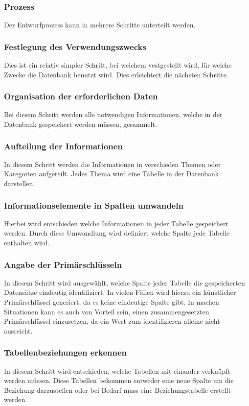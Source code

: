 \subsubsection{Prozess}
Der Entwurfprozess kann in mehrere Schritte unterteilt werden.
\subsubsection{Festlegung des Verwendungszwecks}
Dies ist ein relativ simpler Schritt, bei welchem vestgestellt wird, für welche Zwecke die Datenbank benutzt wird. Dies erleichtert die nächsten Schritte.
\subsubsection{Organisation der erforderlichen Daten}
Bei diesem Schritt werden alle notwendigen Informationen, welche in der Datenbank gespeichert werden müssen, gesammelt.
\subsubsection{Aufteilung der Informationen}
In diesem Schritt werden die Informationen in verschieden Themen oder Kategorien aufgeteilt. Jedes Thema wird eine Tabelle in der Datenbank darstellen.
\subsubsection{Informationselemente in Spalten umwandeln}
Hierbei wird entschieden welche Informationen in jeder Tabelle gespeichert werden. Durch diese Umwandlung wird definiert welche Spalte jede Tabelle enthalten wird.
\subsubsection{Angabe der Primärschlüsseln}
In diesem Schritt wird ausgewählt, welche Spalte jeder Tabelle die gespeicherten Datensätze eindeutig identifiziert. In vielen Fällen wird hierzu ein künstlicher Primärschlüssel generiert, da es keine eindeutige Spalte gibt. 
In machen Situationen kann es auch von Vorteil sein, einen zusammengesetzten Primärschlüssel einzusetzen, da ein Wert zum identifizieren alleine nicht ausreicht.
\subsubsection{Tabellenbeziehungen erkennen}
In diesem Schritt wird entschieden, welche Tabellen mit einander verknüpft werden müssen. Diese Tabellen bekommen entweder eine neue Spalte um die Beziehung darzustellen oder bei Bedarf muss eine Beziehungstabelle erstellt werden.
